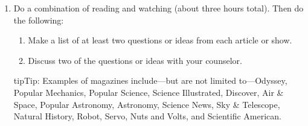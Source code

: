 \documentclass[letterpaper,10pt,english,openany,oneside]{sphinxmanual}
\begin{document}
\begin{description}
\begin{enumerate}
\begin{enumerate}
\end{enumerate}

\begin{sphinxadmonition}{tip}{Tip:}
Books on these topics may be found at your local library. Examples of magazines include—but are not limited to—Odyssey, Kids Discover, National Geographic Kids, Highlights, and Owl.
\end{sphinxadmonition}

\item {} 
Do a combination of reading and watching (about three hours total). Then do the following:
\begin{enumerate}
%
\item {} 
Make a list of at least two questions or ideas from each article or show.

\item {} 
Discuss two of the questions or ideas with your counselor.

\end{enumerate}

\begin{sphinxadmonition}{tip}{Tip:}
Examples of magazines include—but are not limited to—Odyssey, Popular Mechanics, Popular Science, Science Illustrated, Discover, Air \& Space, Popular Astronomy, Astronomy, Science News, Sky \& Telescope, Natural History, Robot, Servo, Nuts and Volts, and Scientific American.
\end{sphinxadmonition}

\end{enumerate}

\end{description}
\end{document}
